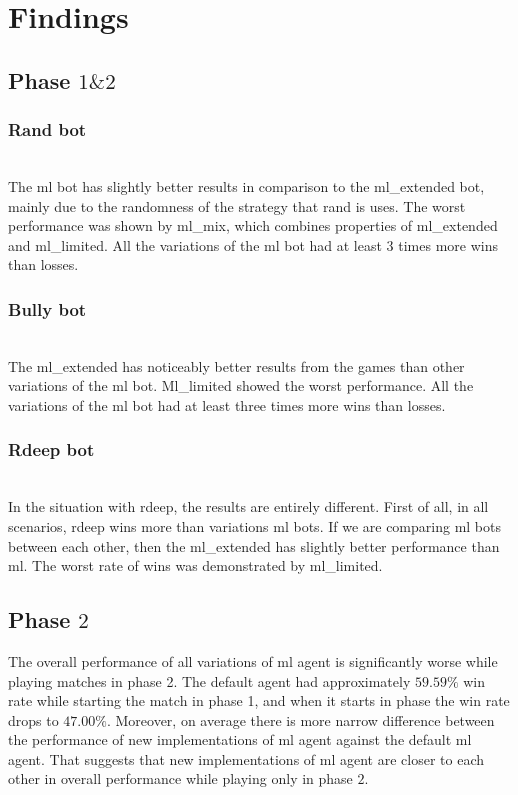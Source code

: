 \documentclass[master]{subfiles}
\begin{document}
\section{Findings}
\subsection{Phase \texorpdfstring{$1 \& 2$}{1\&2}}
\subsubsection{Rand bot} 
\hfill\\ %
The ml bot has slightly better results in comparison to the ml\_extended bot, mainly due to the randomness of the strategy that rand is uses. The worst performance was shown by ml\_mix, which combines properties of ml\_extended and ml\_limited. All the variations of the ml bot had at least 3 times more wins than losses.
\subsubsection{Bully bot} 
\hfill\\ 
The ml\_extended has noticeably better results from the games than other variations of the ml bot. Ml\_limited showed the worst performance. All the variations of the ml bot had at least three times more wins than losses.
\subsubsection{Rdeep bot} 
\hfill\\ 
In the situation with rdeep, the results are entirely different. First of all, in all scenarios, rdeep wins more than variations ml bots. If we are comparing ml bots between each other, then the ml\_extended has slightly better performance than ml. The worst rate of wins was demonstrated by ml\_limited.
\subsection{Phase \texorpdfstring{$2$}{2}}
The overall performance of all variations of ml agent is significantly worse while playing matches in phase 2. The default agent had approximately $59.59\%$ win rate while starting the match in phase 1, and when it starts in phase the win rate drops to $47.00\%$. Moreover, on average there is more narrow difference between the performance of new implementations of ml agent against the default ml agent. That suggests that new implementations of ml agent are closer to each other in overall performance while playing only in phase $2$.
\end{document}
